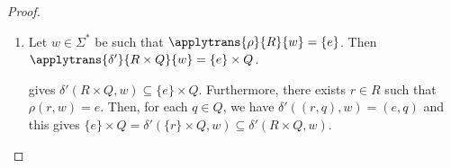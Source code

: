 \begin{proof}
\begin{enumerate}

		
		\item \label{constrsync:prefix:prop:exactsync} Let $w \in \Sigma^*$ be such that $\applytrans{\rho}{R}{w} = \{e\}$.
		Then $\applytrans{\delta'}{R \times Q}{w} = \{e\} \times Q$.
		
		
		gives $\delta'(R \times Q, w) \subseteq \{e\} \times Q$.
		Furthermore, there exists $r \in R$ such that $\rho(r, w) = e$.
		Then, for each $q \in Q$, we have $\delta'((r, q), w) = (e,q)$
		and this gives $\{e\} \times Q = \delta'(\{r\} \times Q, w) \subseteq \delta'(R \times Q, w)$. 	    	
	\end{enumerate}   
	

\end{proof}
